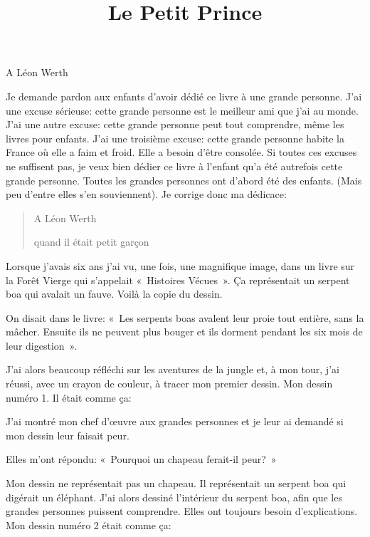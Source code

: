 \documentclass{report}
\title{Le Petit Prince}
\begin{document}
\sloppy

\begin{center}
    \Huge A Léon Werth
\end{center}

Je demande pardon aux enfants d'avoir dédié ce livre à une grande personne. J'ai une excuse sérieuse: cette grande personne est le meilleur ami que j'ai au monde. J'ai une autre excuse: cette grande personne peut tout comprendre, même les livres pour enfants. J'ai une troisième excuse: cette grande personne habite la France où elle a faim et froid. Elle a besoin d'être consolée. Si toutes ces excuses ne suffisent pas, je veux bien dédier ce livre à l'enfant qu'a été autrefois cette grande personne. Toutes les grandes personnes ont d'abord été des enfants. (Mais peu d'entre elles s'en souviennent). Je corrige donc ma dédicace:

\begin{quote}
    \centering
    A Léon Werth

    quand il était petit garçon
\end{quote}

\parachapter[I]{} %
Lorsque j'avais six ans j'ai vu, une fois, une magnifique image, dans un livre sur la Forêt Vierge qui s'appelait «~Histoires Vécues~». Ça représentait un serpent boa qui avalait un fauve. Voilà la copie du dessin.


On disait dans le livre: «~Les serpents boas avalent leur proie tout entière, sans la mâcher. Ensuite ils ne peuvent plus bouger et ils dorment pendant les six mois de leur digestion~».

J'ai alors beaucoup réfléchi sur les aventures de la jungle et, à mon tour, j'ai réussi, avec un crayon de couleur, à tracer mon premier dessin. Mon dessin numéro 1. Il était comme ça:


J'ai montré mon chef d'œuvre aux grandes personnes et je leur ai demandé si mon dessin leur faisait peur.

Elles m'ont répondu: «~Pourquoi un chapeau ferait-il peur?~»

Mon dessin ne représentait pas un chapeau. Il représentait un serpent boa qui digérait un éléphant. J'ai alors dessiné l'intérieur du serpent boa, afin que les grandes personnes puissent comprendre. Elles ont toujours besoin d'explications. Mon dessin numéro 2 était comme ça:
\end{document}

